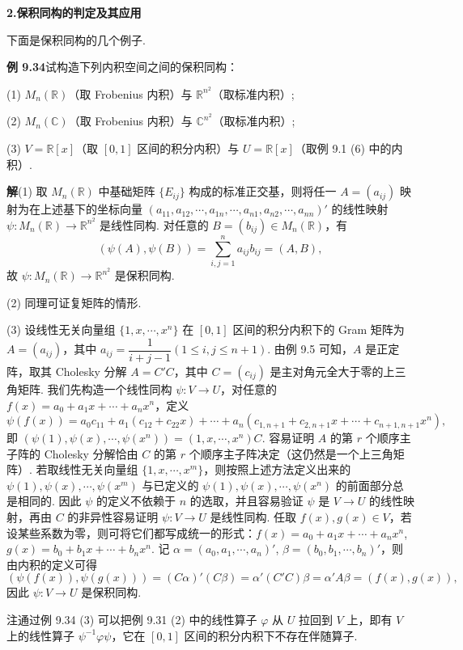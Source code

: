 \documentclass[UTF8, 12pt, fontset=fandol, oneside]{ctexart}
\begin{document}
\noindent\textbf{2.\quad 保积同构的判定及其应用}

下面是保积同构的几个例子.

\noindent\textbf{例 9.34}\quad 试构造下列内积空间之间的保积同构：

(1) $M_n(\mathbb{R})$（取 Frobenius 内积）与 $\mathbb{R}^{n^2}$（取标准内积）;

(2) $M_n(\mathbb{C})$（取 Frobenius 内积）与 $\mathbb{C}^{n^2}$（取标准内积）;

(3) $V=\mathbb{R}[x]$（取 $[0,1]$ 区间的积分内积）与 $U=\mathbb{R}[x]$（取例 9.1 (6) 中的内积）.

\noindent\textbf{解}\quad (1) 取 $M_n(\mathbb{R})$ 中基础矩阵 $\{E_{ij}\}$ 构成的标准正交基，则将任一 $A=(a_{ij})$ 映射为在上述基下的坐标向量 $(a_{11},a_{12},\cdots,a_{1n},\cdots,a_{n1},a_{n2},\cdots,a_{nn})'$ 的线性映射 $\psi:M_n(\mathbb{R})\to\mathbb{R}^{n^2}$ 是线性同构. 对任意的 $B=(b_{ij})\in M_n(\mathbb{R})$，有
\[
(\psi(A),\psi(B))=\sum_{i,j=1}^n a_{ij}b_{ij}=(A,B),
\]
故 $\psi:M_n(\mathbb{R})\to\mathbb{R}^{n^2}$ 是保积同构.

(2) 同理可证复矩阵的情形.

(3) 设线性无关向量组 $\{1,x,\cdots,x^n\}$ 在 $[0,1]$ 区间的积分内积下的 Gram 矩阵为 $A=(a_{ij})$，其中 $a_{ij}=\dfrac1{i+j-1}(1\le i,j\le n+1)$. 由例 9.5 可知，$A$ 是正定阵，取其 Cholesky 分解 $A=C'C$，其中 $C=(c_{ij})$ 是主对角元全大于零的上三角矩阵. 我们先构造一个线性同构 $\psi:V\to U$，对任意的 $f(x)=a_0+a_1x+\cdots+a_nx^n$，定义
\[
\psi(f(x))=a_0c_{11}+a_1(c_{12}+c_{22}x)+\cdots+a_n(c_{1,n+1}+c_{2,n+1}x+\cdots+c_{n+1,n+1}x^n),
\]
即 $(\psi(1),\psi(x),\cdots,\psi(x^n))=(1,x,\cdots,x^n)C$. 容易证明 $A$ 的第 $r$ 个顺序主子阵的 Cholesky 分解恰由 $C$ 的第 $r$ 个顺序主子阵决定（这仍然是一个上三角矩阵）. 若取线性无关向量组 $\{1,x,\cdots,x^m\}$，则按照上述方法定义出来的 $\psi(1),\psi(x),\cdots,\psi(x^m)$ 与已定义的 $\psi(1),\psi(x),\cdots,\psi(x^n)$ 的前面部分总是相同的. 因此 $\psi$ 的定义不依赖于 $n$ 的选取，并且容易验证 $\psi$ 是 $V\to U$ 的线性映射，再由 $C$ 的非异性容易证明 $\psi:V\to U$ 是线性同构. 任取 $f(x),g(x)\in V$，若设某些系数为零，则可将它们都写成统一的形式：$f(x)=a_0+a_1x+\cdots+a_nx^n$, $g(x)=b_0+b_1x+\cdots+b_nx^n$. 记 $\alpha=(a_0,a_1,\cdots,a_n)'$, $\beta=(b_0,b_1,\cdots,b_n)'$，则由内积的定义可得
\[
(\psi(f(x)),\psi(g(x)))=(C\alpha)'(C\beta)=\alpha'(C'C)\beta=\alpha'A\beta=(f(x),g(x)),
\]
因此 $\psi:V\to U$ 是保积同构.

注\quad 通过例 9.34 (3) 可以把例 9.31 (2) 中的线性算子 $\varphi$ 从 $U$ 拉回到 $V$ 上，即有 $V$ 上的线性算子 $\psi^{-1}\varphi\psi$，它在 $[0,1]$ 区间的积分内积下不存在伴随算子.
\end{document}
